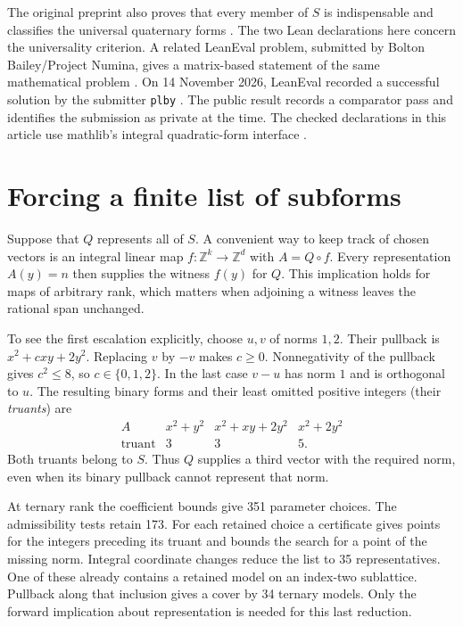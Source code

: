 \documentclass[11pt,a4paper]{article}
\newcommand{\ZZ}{\mathbb Z}
\newcommand{\code}[1]{\texttt{#1}}
\begin{document}
The original preprint also proves that every member of $S$ is indispensable
and classifies the universal quaternary forms \cite[Theorems~2 and~4]{BH}.
The two Lean declarations here concern the universality criterion. A related
LeanEval problem, submitted by Bolton Bailey/Project Numina, gives a
matrix-based statement of the same mathematical problem \cite{LeanEval}.
On 14 November 2026, LeanEval recorded a successful solution by the
submitter \code{plby} \cite{plby}. The public result records a comparator
pass and identifies the submission as private at the time. The checked declarations in this article use mathlib's integral
quadratic-form interface \cite{Mathlib}.

\section{Forcing a finite list of subforms}
Suppose that $Q$ represents all of $S$. A convenient way to keep track of
chosen vectors is an integral linear map $f\colon\ZZ^k\to\ZZ^d$ with
$A=Q\circ f$. Every representation $A(y)=n$ then supplies the witness
$f(y)$ for $Q$. This implication holds for maps of arbitrary rank, which
matters when adjoining a witness leaves the rational span unchanged.

To see the first escalation explicitly, choose $u,v$ of norms $1,2$.
Their pullback is $x^2+cxy+2y^2$. Replacing $v$ by $-v$ makes $c\geq0$.
Nonnegativity of the pullback gives $c^2\leq8$, so $c\in\{0,1,2\}$.
In the last case $v-u$ has norm $1$ and is orthogonal to $u$.
The resulting binary forms and their least omitted positive integers
(their \emph{truants}) are
\[
\begin{array}{c|ccc}
 A & x^2+y^2 & x^2+xy+2y^2 & x^2+2y^2\\ \hline
 \text{truant} &3&3&5.
\end{array}
\]
Both truants belong to $S$. Thus $Q$ supplies a third vector with the
required norm, even when its binary pullback cannot represent that norm.

At ternary rank the coefficient bounds give 351 parameter choices.
The admissibility tests retain 173. For each retained choice a certificate
gives points for the integers preceding its truant and bounds the search
for a point of the missing norm. Integral coordinate changes reduce the
list to 35 representatives. One of these already contains a retained
model on an index-two sublattice. Pullback along that inclusion gives a
cover by 34 ternary models. Only the forward implication about
representation is needed for this last reduction.
\end{document}
